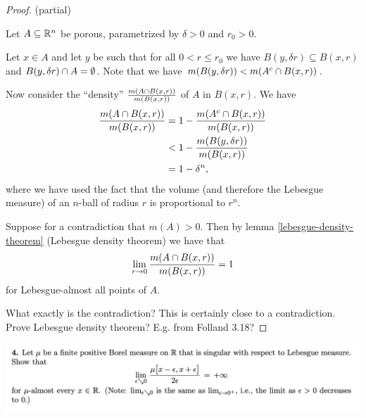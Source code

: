   \begin{proof}
     (partial)

    Let $A \subseteq \mathbb{R}^n$ be porous, parametrized by $\delta > 0$ and $r_0 > 0$.

    Let $x \in A$ and let $y$ be such that for all $0 < r \leq r_0$ we have $B(y, \delta r) \subseteq B(x, r)$
    and $B(y, \delta r) \cap A = \emptyset$. Note that we have $m(B(y, \delta r)) < m(A^c \cap B(x, r))$.

    Now consider the ``density​'' $\frac{m(A \cap B(x, r))}{m(B(x, r))}$ of $A$ in $B(x, r)$. We have
    \begin{align*}
      \frac{m(A \cap B(x, r))}{m(B(x, r))}
      &= 1 - \frac{m(A^c \cap B(x, r))}{m(B(x, r))} \\
      &< 1 - \frac{m(B(y, \delta r))}{m(B(x, r))} \\
      &= 1 - \delta^n,
    \end{align*}
    where we have used the fact that the volume (and therefore the Lebesgue measure) of an $n$-ball of radius $r$
    is proportional to $r^n$.

    Suppose for a contradiction that $m(A) > 0$. Then by lemma \ref{lebesgue-density-theorem} (Lebesgue density
    theorem) we have that
    \begin{align*}
      \lim_{r \to 0} \frac{m(A \isect B(x, r))}{m(B(x, r))} = 1
    \end{align*}
    for Lebesgue-almost all points of $A$.

     What exactly is the contradiction? This is certainly close to a contradiction.
     Prove Lebesgue density theorem? E.g. from Folland 3.18?

  \end{proof}



  \newpage
  \begin{mdframed}
    \includegraphics[width=400pt]{img/analysis--berkeley-202a-final-21a6.png}
  \end{mdframed}

